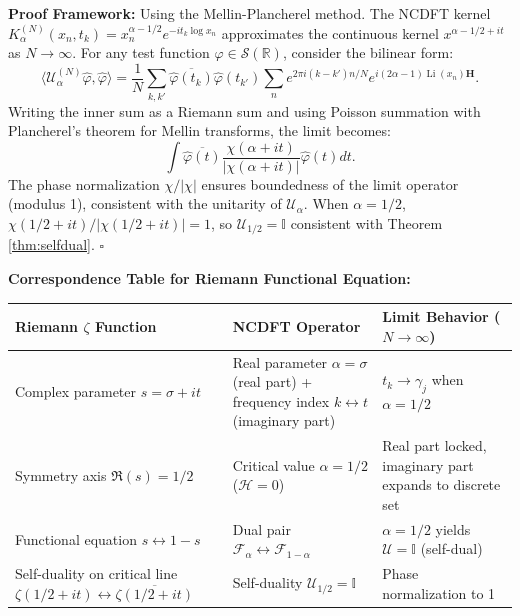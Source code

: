 \documentclass[12pt,a4paper]{amsart}
\theoremstyle{plain}
\theoremstyle{definition}
\theoremstyle{remark}
\begin{document}
\textbf{Proof Framework:} Using the Mellin-Plancherel method. The NCDFT kernel $K_\alpha^{(N)}(x_n,t_k)=x_n^{\alpha-1/2}e^{-it_k\log x_n}$ approximates the continuous kernel $x^{\alpha-1/2+it}$ as $N\to\infty$. For any test function $\varphi\in\mathcal{S}(\mathbb{R})$, consider the bilinear form:
\begin{equation}
\langle \mathcal{U}_\alpha^{(N)}\hat{\varphi},\hat{\varphi}\rangle = \frac{1}{N}\sum_{k,k'}\overline{\hat{\varphi}(t_k)}\hat{\varphi}(t_{k'})\sum_n e^{2\pi i(k-k')n/N} e^{i(2\alpha-1)\operatorname{Li}(x_n)\mathbf{H}}.
\end{equation}
Writing the inner sum as a Riemann sum and using Poisson summation with Plancherel's theorem for Mellin transforms, the limit becomes:
\begin{equation}
\int \overline{\hat{\varphi}(t)} \frac{\chi(\alpha+it)}{|\chi(\alpha+it)|} \hat{\varphi}(t) dt.
\end{equation}
The phase normalization $\chi/|\chi|$ ensures boundedness of the limit operator (modulus 1), consistent with the unitarity of $\mathcal{U}_\alpha$. When $\alpha=1/2$, $\chi(1/2+it)/|\chi(1/2+it)|=1$, so $\mathcal{U}_{1/2}=\mathbb{I}$ consistent with Theorem \ref{thm:selfdual}. $\square$

\textbf{Correspondence Table for Riemann Functional Equation:}

\begin{center}
\begin{tabular}{|l|l|l|}
\hline
Riemann $\zeta$ Function & NCDFT Operator & Limit Behavior ($N\to\infty$) \\
\hline
Complex parameter $s = \sigma + it$ & Real parameter $\alpha = \sigma$ (real part) + frequency index $k\leftrightarrow t$ (imaginary part) & $t_k \to \gamma_j$ when $\alpha=1/2$ \\
\hline
Symmetry axis $\Re(s) = 1/2$ & Critical value $\alpha = 1/2$ ($\mathcal{H}=0$) & Real part locked, imaginary part expands to discrete set \\
\hline
Functional equation $s \leftrightarrow 1-s$ & Dual pair $\mathcal{F}_\alpha \leftrightarrow \mathcal{F}_{1-\alpha}$ & $\alpha=1/2$ yields $\mathcal{U}=\mathbb{I}$ (self-dual) \\
\hline
Self-duality on critical line $\zeta(1/2+it) \leftrightarrow \overline{\zeta(1/2+it)}$ & Self-duality $\mathcal{U}_{1/2} = \mathbb{I}$ & Phase normalization to 1 \\
\hline
\end{tabular}
\end{center}
\end{document}
